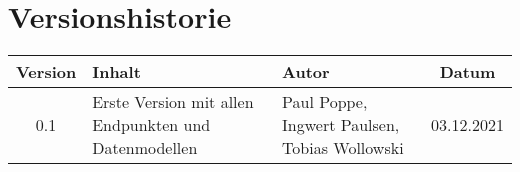 \chapter*{Versionshistorie}
\begin{table}[htb]
	\begin{tabularx}{\textwidth}{|c|X|l|c|}
		\hline
\textbf{Version} & \textbf{Inhalt} & \textbf{Autor} & \textbf{Datum} \\ \hline
0.1 & Erste Version mit allen Endpunkten und Datenmodellen & Paul Poppe, Ingwert Paulsen, Tobias Wollowski & 03.12.2021 \\ \hline
	\end{tabularx}
\end{table}
